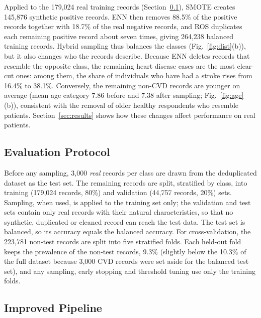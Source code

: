 \documentclass[11pt,a4paper]{article}
\begin{document}
Applied to the 179,024 real training records (Section~\ref{sec:protocols}),
SMOTE creates 145,876 synthetic positive records. ENN then removes 88.5\%
of the positive records together with 18.7\% of the real negative records,
and ROS duplicates each remaining positive record about seven times, giving
264,238 balanced training records. Hybrid sampling thus balances the classes
(Fig.~\ref{fig:dist}(b)), but it also changes who the records describe.
Because ENN deletes records that resemble the opposite class, the remaining
heart disease cases are the most clear-cut ones: among them, the share of
individuals who have had a stroke rises from 16.4\% to 38.1\%. Conversely,
the remaining non-CVD records are younger on average (mean age category
7.86 before and 7.38 after sampling; Fig.~\ref{fig:age}(b)), consistent
with the removal of older healthy respondents who resemble patients. Section~\ref{sec:results}
shows how these changes affect performance on real patients.

\subsection{Evaluation Protocol}
\label{sec:protocols}

Before any sampling, 3,000 \emph{real} records per class are drawn from the
deduplicated dataset as the test set. The remaining records are split,
stratified by class, into training (179,024 records, 80\%) and validation
(44,757 records, 20\%) sets. Sampling, when used, is applied to the
training set only; the validation and test sets contain only real records
with their natural characteristics, so that no synthetic, duplicated or
cleaned record can reach the test data. The test set is balanced, so its
accuracy equals the balanced accuracy. For cross-validation, the 223,781
non-test records are split into five stratified folds. Each held-out fold
keeps the prevalence of the non-test records, 9.3\% (slightly below the
10.3\% of the full dataset because 3,000 CVD records were set aside for the
balanced test set), and any sampling, early stopping
and threshold tuning use only the training folds.

\subsection{Improved Pipeline}
\label{sec:improved}
\end{document}
